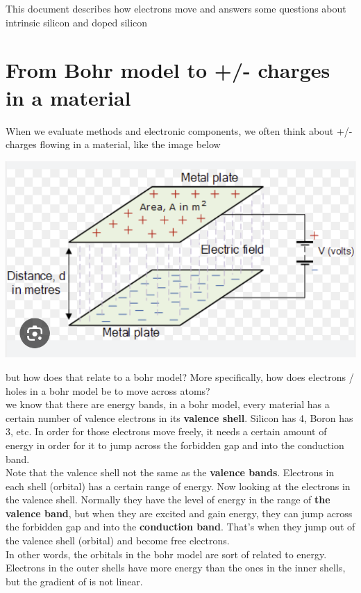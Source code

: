 \documentclass{article}
\begin{document}
	This document describes how electrons move and answers some questions about intrinsic silicon and doped silicon
	\section{From Bohr model to +/- charges in a material}
		When we evaluate methods and electronic components, we often think about +/- charges flowing in a material, like the image below
		\begin{center}
			\includegraphics[width=\textwidth]{img/capacitor.png}
		\end{center}
		but how does that relate to a bohr model? More specifically, how does electrons / holes in a bohr model be to move across atoms?\\
		we know that there are energy bands, in a bohr model, every material has a certain number of valence electrons in its \textbf{valence shell}. Silicon has 4, Boron has 3, etc. In order for those electrons move freely, it needs a certain amount of energy in order for it to jump across the forbidden gap and into the conduction band.\\
		Note that the valence shell not the same as the \textbf{valence bands}. 
		Electrons in each shell (orbital) has a certain range of energy. Now looking at the electrons in the valence shell. Normally they have the level of energy in the range of \textbf{the valence band}, but when they are excited and gain energy, they can jump across the forbidden gap and into the \textbf{conduction band}. That's when they jump out of the valence shell (orbital) and become free electrons. \\
		In other words, the orbitals in the bohr model are sort of related to energy. Electrons in the outer shells have more energy than the ones in the inner shells, but the gradient of is not linear. 
\end{document}
